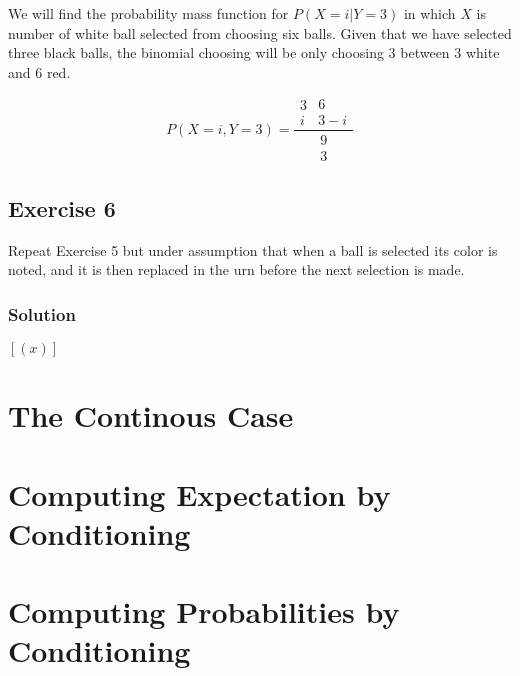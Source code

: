 \documentclass[12pt,a4paper]{article}
\begin{document}
We will find the probability mass function for $P(X=i|Y=3)$ in which $X$ is number of white ball selected from choosing six balls. Given that we have selected three black balls, the binomial choosing will be only choosing 3 between 3 white and 6 red.

\[
P(X=i, Y=3) = 
\frac{\begin{array}{c}3\\i\end{array}\begin{array}{c}6\\3-i\end{array}}{\begin{array}{c}9\\3\end{array}}
\]


\subsection{Exercise 6}

Repeat Exercise 5 but under assumption that when a ball is selected its color is noted, and it is then replaced in the urn before the next selection is made.


\subsubsection{Solution}

$[(x)]$

\section{The Continous Case}
\section{Computing Expectation by Conditioning}
\section{Computing Probabilities by Conditioning}
\end{document}
